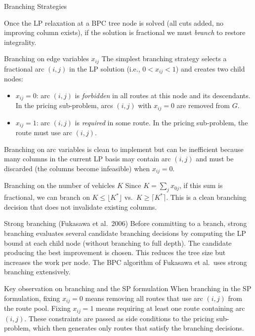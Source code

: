 \documentclass[aspectratio=169,10pt]{beamer}
\begin{document}
\begin{frame}[allowframebreaks]{Branching Strategies}

Once the LP relaxation at a BPC tree node is solved (all cuts added,
no improving column exists), if the solution is fractional we must
\emph{branch} to restore integrality.

\begin{block}{Branching on edge variables $x_{ij}$}
The simplest branching strategy selects a fractional arc $(i,j)$ in the
LP solution (i.e., $0 < x_{ij} < 1$) and creates two child nodes:
\begin{itemize}
  \item $x_{ij} = 0$: arc $(i,j)$ is \emph{forbidden} in all routes at
        this node and its descendants. In the pricing sub-problem, arcs
        $(i,j)$ with $x_{ij} = 0$ are removed from $G$.
  \item $x_{ij} = 1$: arc $(i,j)$ is \emph{required} in some route.
        In the pricing sub-problem, the route must use arc $(i,j)$.
\end{itemize}
\end{block}

Branching on arc variables is clean to implement but can be inefficient
because many columns in the current LP basis may contain arc $(i,j)$
and must be discarded (the columns become infeasible) when
$x_{ij} = 0$.

\framebreak

\begin{block}{Branching on the number of vehicles $K$}
Since $K = \sum_j x_{0j}$, if this sum is fractional, we can branch on
$K \leq \lfloor K^* \rfloor$ vs.\ $K \geq \lceil K^* \rceil$. This is
a clean branching decision that does not invalidate existing columns.
\end{block}

\begin{block}{Strong branching (Fukasawa et al.\ 2006)}
Before committing to a branch, strong branching evaluates several
candidate branching decisions by computing the LP bound at each child
node (without branching to full depth). The candidate producing the
best improvement is chosen. This reduces the tree size but increases
the work per node. The BPC algorithm of Fukasawa et al.\ uses strong
branching extensively.
\end{block}

\begin{alertblock}{Key observation on branching and the SP formulation}
When branching in the SP formulation, fixing $x_{ij} = 0$ means removing
all routes that use arc $(i,j)$ from the route pool. Fixing $x_{ij} = 1$
means requiring at least one route containing arc $(i,j)$. These
constraints are passed as side conditions to the pricing sub-problem,
which then generates only routes that satisfy the branching decisions.
\end{alertblock}


\end{frame}
\end{document}
